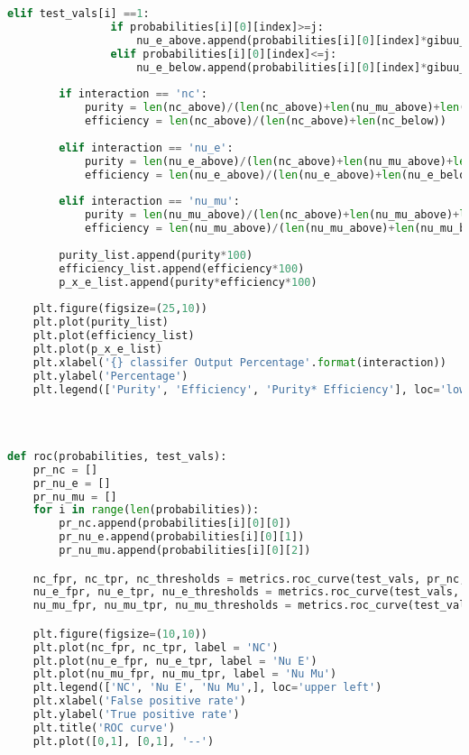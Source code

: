 \begin{lstlisting}[language=Python]
            elif test_vals[i] ==1:        
                if probabilities[i][0][index]>=j:
                    nu_e_above.append(probabilities[i][0][index]*gibuu_weights[i])
                elif probabilities[i][0][index]<=j:
                    nu_e_below.append(probabilities[i][0][index]*gibuu_weights[i])
        
        if interaction == 'nc':
            purity = len(nc_above)/(len(nc_above)+len(nu_mu_above)+len(nu_e_above))
            efficiency = len(nc_above)/(len(nc_above)+len(nc_below))
            
        elif interaction == 'nu_e':
            purity = len(nu_e_above)/(len(nc_above)+len(nu_mu_above)+len(nu_e_above))
            efficiency = len(nu_e_above)/(len(nu_e_above)+len(nu_e_below))
            
        elif interaction == 'nu_mu':      
            purity = len(nu_mu_above)/(len(nc_above)+len(nu_mu_above)+len(nu_e_above))
            efficiency = len(nu_mu_above)/(len(nu_mu_above)+len(nu_mu_below))
            
        purity_list.append(purity*100)
        efficiency_list.append(efficiency*100)
        p_x_e_list.append(purity*efficiency*100)
    
    plt.figure(figsize=(25,10))
    plt.plot(purity_list)
    plt.plot(efficiency_list)
    plt.plot(p_x_e_list)
    plt.xlabel('{} classifer Output Percentage'.format(interaction))
    plt.ylabel('Percentage')
    plt.legend(['Purity', 'Efficiency', 'Purity* Efficiency'], loc='lower left')
    
    
    
    
def roc(probabilities, test_vals):
    pr_nc = []
    pr_nu_e = []
    pr_nu_mu = []
    for i in range(len(probabilities)):
        pr_nc.append(probabilities[i][0][0])
        pr_nu_e.append(probabilities[i][0][1])
        pr_nu_mu.append(probabilities[i][0][2])

    nc_fpr, nc_tpr, nc_thresholds = metrics.roc_curve(test_vals, pr_nc, pos_label=0)
    nu_e_fpr, nu_e_tpr, nu_e_thresholds = metrics.roc_curve(test_vals, pr_nu_e, pos_label=1)
    nu_mu_fpr, nu_mu_tpr, nu_mu_thresholds = metrics.roc_curve(test_vals, pr_nu_mu, pos_label=2)

    plt.figure(figsize=(10,10))
    plt.plot(nc_fpr, nc_tpr, label = 'NC')
    plt.plot(nu_e_fpr, nu_e_tpr, label = 'Nu E')
    plt.plot(nu_mu_fpr, nu_mu_tpr, label = 'Nu Mu')
    plt.legend(['NC', 'Nu E', 'Nu Mu',], loc='upper left')
    plt.xlabel('False positive rate')
    plt.ylabel('True positive rate')
    plt.title('ROC curve')
    plt.plot([0,1], [0,1], '--')
    

\end{lstlisting}

